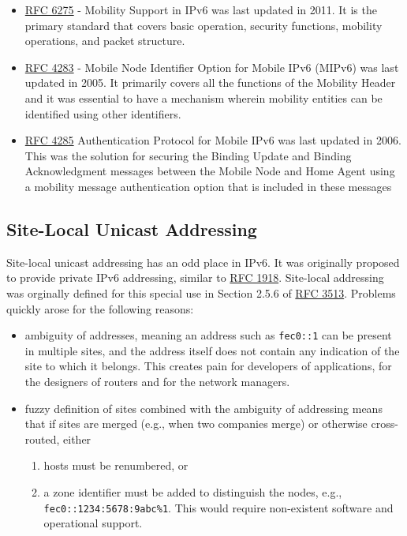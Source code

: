 \documentclass[
]{article}
\providecommand{\tightlist}{%
  \setlength{\itemsep}{0pt}\setlength{\parskip}{0pt}}
\begin{document}
\begin{itemize}
\tightlist
\item
  \href{https://www.rfc-editor.org/rfc/rfc6275.html}{RFC 6275} -
  Mobility Support in IPv6 was last updated in 2011. It is the primary
  standard that covers basic operation, security functions, mobility
  operations, and packet structure.
\item
  \href{https://www.rfc-editor.org/rfc/rfc4283.html}{RFC 4283} - Mobile
  Node Identifier Option for Mobile IPv6 (MIPv6) was last updated in
  2005. It primarily covers all the functions of the Mobility Header and
  it was essential to have a mechanism wherein mobility entities can be
  identified using other identifiers.
\item
  \href{https://www.rfc-editor.org/info/rfc4285}{RFC 4285}
  Authentication Protocol for Mobile IPv6 was last updated in 2006. This
  was the solution for securing the Binding Update and Binding
  Acknowledgment messages between the Mobile Node and Home Agent using a
  mobility message authentication option that is included in these
  messages
\end{itemize}

\subsection{Site-Local Unicast
Addressing}\label{site-local-unicast-addressing}

Site-local unicast addressing has an odd place in IPv6. It was
originally proposed to provide private IPv6 addressing, similar to
\href{https://www.rfc-editor.org/rfc/rfc1918.html}{RFC 1918}. Site-local
addressing was orginally defined for this special use in Section 2.5.6
of \href{https://www.rfc-editor.org/rfc/rfc3513.html\#section-2.5.6}{RFC
3513}. Problems quickly arose for the following reasons:

\begin{itemize}
\tightlist
\item
  ambiguity of addresses, meaning an address such as \texttt{fec0::1}
  can be present in multiple sites, and the address itself does not
  contain any indication of the site to which it belongs. This creates
  pain for developers of applications, for the designers of routers and
  for the network managers.
\item
  fuzzy definition of sites combined with the ambiguity of addressing
  means that if sites are merged (e.g., when two companies merge) or
  otherwise cross-routed, either

  \begin{enumerate}
  \def\labelenumi{\arabic{enumi}.}
  \tightlist
  \item
    hosts must be renumbered, or
  \item
    a zone identifier must be added to distinguish the nodes, e.g.,
    \texttt{fec0::1234:5678:9abc\%1}. This would require non-existent
    software and operational support.
  \end{enumerate}
\end{itemize}
\end{document}
